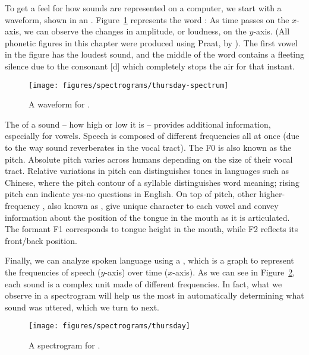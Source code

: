 To get a feel for how sounds are represented on a computer, we start
with a waveform, shown in an .
Figure~\ref{fig:waveform} represents the word : As
time passes on the $x$-axis, we can observe the changes in amplitude, or
loudness, on the $y$-axis. (All phonetic figures in this chapter were produced using Praat, by \citealt{Boersma2003PraatDP}). 
The first vowel in the figure has the loudest sound, and the middle of the word contains a fleeting silence due to the consonant {[d]} which completely stops the air for that instant.

\begin{figure}
  \texttt{[image: figures/spectrograms/thursday-spectrum]}
\caption{A waveform for .}
\label{fig:waveform}
\end{figure}
  

The  of a sound -- how high or low it is -- provides
additional information, especially for vowels.  Speech is composed of
different frequencies all at once (due to the way sound reverberates
in the vocal tract).  The  F0 is also known as the pitch.  Absolute pitch varies across humans depending on the size of their vocal tract.  Relative variations in pitch can distinguishes tones in languages such as Chinese, where the pitch contour of a syllable distinguishes word meaning; rising pitch can indicate yes-no questions in English.  On top of pitch,  other higher-frequency , also known as , give unique character to each vowel and convey information about the position of the tongue in the mouth as it is articulated. The formant F1 corresponds to tongue height in the mouth, while F2 reflects its front/back position.

Finally, we can analyze spoken language using a ,
which is a graph to represent the frequencies of speech ($y$-axis) over
time ($x$-axis).  As we can see in Figure~\ref{fig:spectrogram}, each
sound is a complex unit made of different frequencies.  In fact, what
we observe in a spectrogram will help us the most in automatically
determining what sound was uttered, which we turn to next.

\begin{figure}
\texttt{[image: figures/spectrograms/thursday]}
\caption{A spectrogram for .}
\label{fig:spectrogram}
\end{figure}

